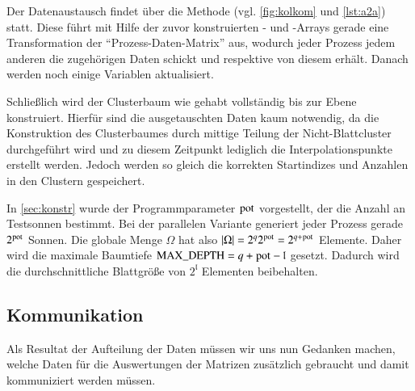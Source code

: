     Der Datenaustausch findet über die Methode  (vgl. \autoref{fig:kolkom} und \autoref{lst:a2a}) statt. Diese führt mit Hilfe der zuvor konstruierten - und 
    -Arrays gerade eine Transformation der ``Prozess-Daten-Matrix'' aus, wodurch jeder Prozess jedem anderen die zugehörigen Daten schickt und respektive von diesem erhält.
    Danach werden noch einige Variablen aktualisiert. 
    
    Schließlich wird der Clusterbaum wie gehabt vollständig bis zur Ebene  konstruiert. Hierfür sind die ausgetauschten Daten kaum notwendig, da die Konstruktion des Clusterbaumes
    durch mittige Teilung der Nicht-Blattcluster durchgeführt wird und zu diesem Zeitpunkt lediglich die Interpolationspunkte erstellt werden. Jedoch werden so gleich die korrekten Startindizes und
    Anzahlen in den Clustern gespeichert.
    
    In \autoref{sec:konstr} wurde der Programmparameter $\tcode{pot}$ vorgestellt, der die Anzahl an Testsonnen bestimmt. Bei der parallelen Variante generiert jeder Prozess gerade $2^{\tcode{pot}}$
    Sonnen. Die globale Menge $\Omega$ hat also $|\Omega| = 2^q 2^\tcode{pot} = 2^{q+\tcode{pot}}$ Elemente. Daher wird die maximale Baumtiefe $\tcode{MAX_DEPTH} = q + \tcode{pot} - \mathfrak{l}$ 
    gesetzt. Dadurch wird die durchschnittliche Blattgröße von $2^\mathfrak{l}$ Elementen beibehalten.
    
  \subsection{Kommunikation}
  \label{sec:komm}
    Als Resultat der Aufteilung der Daten müssen wir uns nun Gedanken machen, welche Daten für die Auswertungen der Matrizen zusätzlich gebraucht und damit kommuniziert werden müssen.
    